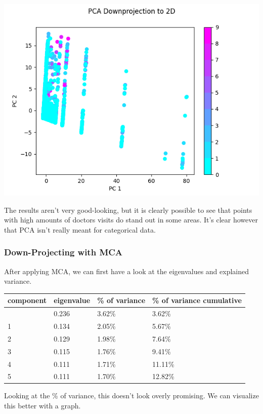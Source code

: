 \documentclass[
]{article}
\begin{document}
\includegraphics{pca_down_2d.png}

The results aren't very good-looking, but it is clearly possible to see
that points with high amounts of doctors visits do stand out in some
areas. It's clear however that PCA isn't really meant for categorical
data.

\subsubsection{Down-Projecting with MCA}\label{down-projecting-with-mca}

After applying MCA, we can first have a look at the eigenvalues and
explained variance.

\begin{longtable}[]{@{}llll@{}}
\toprule\noalign{}
component & eigenvalue & \% of variance & \% of variance cumulative \\
\midrule\noalign{}
\endhead
\bottomrule\noalign{}
\endlastfoot
0 & 0.236 & 3.62\% & 3.62\% \\
1 & 0.134 & 2.05\% & 5.67\% \\
2 & 0.129 & 1.98\% & 7.64\% \\
3 & 0.115 & 1.76\% & 9.41\% \\
4 & 0.111 & 1.71\% & 11.11\% \\
5 & 0.111 & 1.70\% & 12.82\% \\
\end{longtable}

Looking at the \% of variance, this doesn't look overly promising. We
can visualize this better with a graph.
\end{document}
